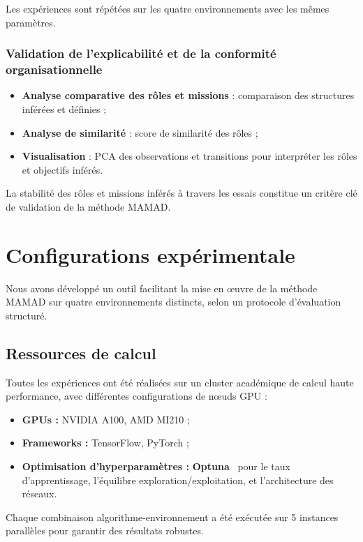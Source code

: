 Les expériences sont répétées sur les quatre environnements avec les mêmes paramètres.

\subsubsection{Validation de l'explicabilité et de la conformité organisationnelle}

\begin{itemize}
    \item \textbf{Analyse comparative des rôles et missions} : comparaison des structures inférées et définies ;
    \item \textbf{Analyse de similarité} : score de similarité des rôles ;
    \item \textbf{Visualisation} : \ac{PCA} des observations et transitions pour interpréter les rôles et objectifs inférés.
\end{itemize}

La stabilité des rôles et missions inférés à travers les essais constitue un critère clé de validation de la méthode \ac{MAMAD}.

\section{Configurations expérimentale}
\label{sec:experimental_setup}

Nous avons développé un outil facilitant la mise en œuvre de la méthode \ac{MAMAD} sur quatre environnements distincts, selon un protocole d'évaluation structuré.

\subsection{Ressources de calcul}

Toutes les expériences ont été réalisées sur un cluster académique de calcul haute performance, avec différentes configurations de nœuds GPU :
\begin{itemize}
    \item \textbf{GPUs :} NVIDIA A100, AMD MI210 ;
    \item \textbf{Frameworks :} TensorFlow, PyTorch ;
    \item \textbf{Optimisation d'hyperparamètres :} \textbf{Optuna}~\cite{akiba2019optuna} pour le taux d'apprentissage, l'équilibre exploration/exploitation, et l'architecture des réseaux.
\end{itemize}

Chaque combinaison algorithme-environnement a été exécutée sur 5 instances parallèles pour garantir des résultats robustes.

